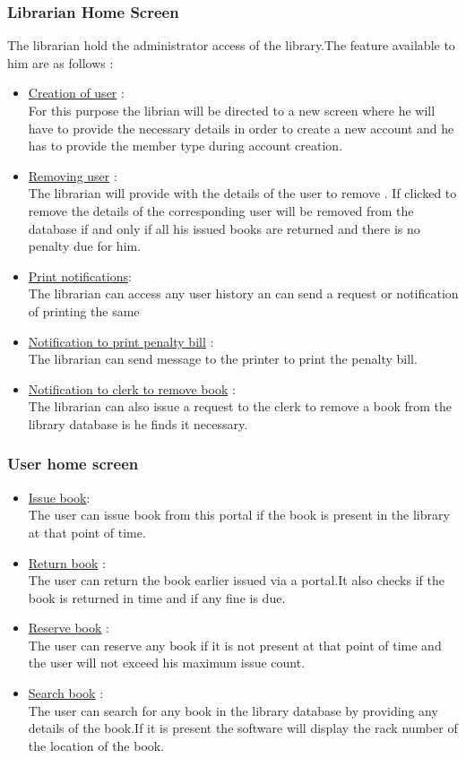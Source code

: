 \documentclass{article}
\begin{document}
\subsubsection*{Librarian Home Screen}
The librarian hold the administrator access of the library.The feature available to him are as follows :
\begin{itemize}
\item \underline{Creation of user} :\\
For this purpose the librian will be directed to a new screen where he will have to provide the necessary details in order to create a new account and he has to provide the member type during account creation.
\item \underline{Removing user} : \\
The librarian will provide with the details of the user to remove . If clicked to remove the details of the corresponding user will be removed from the database if and only if all his issued books are returned and there is no penalty due for him.
\item \underline{Print notifications}:\\ The librarian can access any user history an can send a request or notification of printing the same
\item \underline{Notification to print penalty bill} :\\ The librarian can send message to the printer to print the penalty bill.
\item \underline{Notification to clerk to remove book} :\\
The librarian can also issue a request to the clerk to remove a book from the library database is he finds it necessary.
\end{itemize}

\subsubsection*{User home screen}
\begin{itemize}
\item \underline{Issue book}:\\
The user can issue book from this portal if the book is present in the library at that point of time.
\item \underline{Return book} :\\ The user can return the book earlier issued via a portal.It also checks if the book is returned in time and if any fine is due.
\item \underline{Reserve book} :\\ The user can reserve any book if it is not present at that point of time and the user will not exceed his maximum issue count.
\item \underline{Search book} :\\ The user can search for any book in the library database by providing any details of the book.If it is present the software will display the rack number of the location of the book.

\end{itemize}
\end{document}
